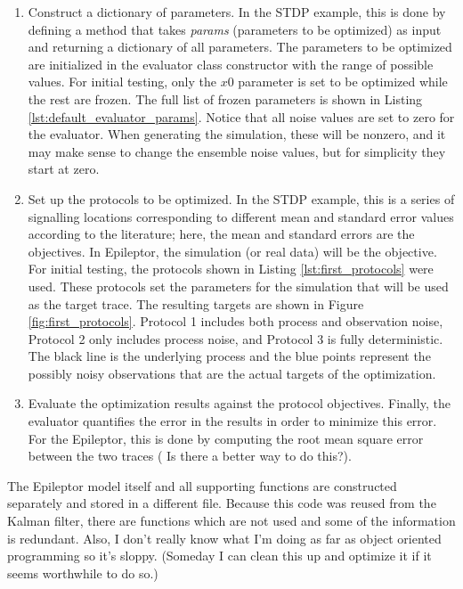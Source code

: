 \documentclass[11pt]{article}
\begin{document}
			\begin{enumerate}
				\item Construct a dictionary of parameters. In the STDP example, this is done by defining a method that takes \textit{params} (parameters to be optimized) as input and returning a dictionary of all parameters. The parameters to be optimized are initialized in the evaluator class constructor with the range of possible values. For initial testing, only the $x0$ parameter is set to be optimized while the rest are frozen. The full list of frozen parameters is shown in Listing \ref{lst:default_evaluator_params}. Notice that all noise values are set to zero for the evaluator. When generating the simulation, these will be nonzero, and it may make sense to change the ensemble noise values, but for simplicity they start at zero. 
				\item Set up the protocols to be optimized. In the STDP example, this is a series of signalling locations corresponding to different mean and standard error values according to the literature; here, the mean and standard errors are the objectives. In Epileptor, the simulation (or real data) will be the objective. For initial testing, the protocols shown in Listing \ref{lst:first_protocols} were used. These protocols set the parameters for the simulation that will be used as the target trace. The resulting targets are shown in Figure \ref{fig:first_protocols}. Protocol 1 includes both process and observation noise, Protocol 2 only includes process noise, and Protocol 3 is fully deterministic. The black line is the underlying process and the blue points represent the possibly noisy observations that are the actual targets of the optimization.
				\item Evaluate the optimization results against the protocol objectives. Finally, the evaluator quantifies the error in the results in order to minimize this error. For the Epileptor, this is done by computing the root mean square error between the two traces {(\color{red} Is there a better way to do this?)}.
			\end{enumerate}

			The Epileptor model itself and all supporting functions are constructed separately and stored in a different file. Because this code was reused from the Kalman filter, there are functions which are not used and some of the information is redundant. Also, I don't really know what I'm doing as far as object oriented programming so it's sloppy. {\color{red} (Someday I can clean this up and optimize it if it seems worthwhile to do so.)}
\end{document}

